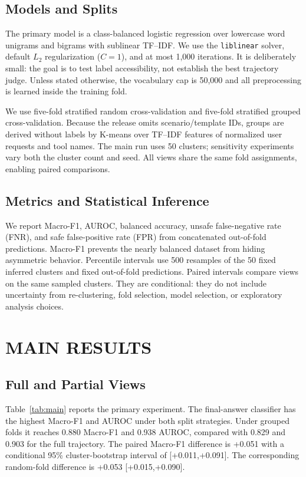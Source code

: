 \documentclass[10pt,twocolumn,twoside]{article}
\begin{document}
\subsection{Models and Splits}
The primary model is a class-balanced logistic regression over lowercase word
unigrams and bigrams with sublinear TF--IDF. We use the \texttt{liblinear} solver,
default $L_2$ regularization ($C=1$), and at most 1,000 iterations. It is deliberately
small: the goal is to test label accessibility, not establish the best trajectory
judge. Unless stated otherwise, the vocabulary cap is 50,000 and all preprocessing
is learned inside the training fold.

We use five-fold stratified random cross-validation and five-fold stratified grouped
cross-validation. Because the release omits scenario/template IDs, groups are
derived without labels by K-means over TF--IDF features of normalized user requests
and tool names. The main run uses 50 clusters; sensitivity experiments vary both the
cluster count and seed. All views share the same fold assignments, enabling paired
comparisons.

\subsection{Metrics and Statistical Inference}
We report Macro-F1, AUROC, balanced accuracy, unsafe false-negative rate (FNR), and
safe false-positive rate (FPR) from concatenated out-of-fold predictions. Macro-F1
prevents the nearly balanced dataset from hiding asymmetric behavior. Percentile
intervals use 500 resamples of the 50 fixed inferred clusters and fixed out-of-fold
predictions.
Paired intervals compare views on the same sampled clusters. They are conditional:
they do not include uncertainty from re-clustering, fold selection, model selection,
or exploratory analysis choices.

\section{MAIN RESULTS}

\subsection{Full and Partial Views}
Table~\ref{tab:main} reports the primary experiment. The final-answer classifier has
the highest Macro-F1 and AUROC under both split strategies. Under grouped folds it
reaches 0.880 Macro-F1 and 0.938 AUROC, compared with 0.829 and 0.903 for the full
trajectory. The paired Macro-F1 difference is +0.051 with a conditional 95\%
cluster-bootstrap interval of [+0.011,+0.091]. The corresponding random-fold
difference is +0.053 [+0.015,+0.090].
\end{document}
